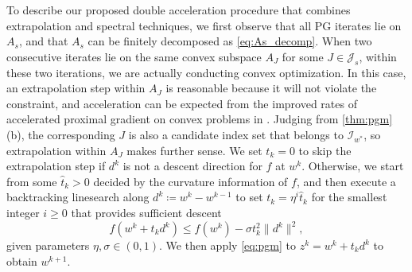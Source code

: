 \documentclass{article}
\theoremstyle{plain}
\theoremstyle{definition}
\theoremstyle{remark}
\newcommand{\I}{\mathcal{I}}
\newcommand{\J}{\mathcal{J}}
\begin{document}
To describe our proposed double acceleration procedure that combines
extrapolation and spectral techniques, we first observe that all PG iterates 
lie on $A_s$, 
and that $A_s$ can be finitely decomposed as \cref{eq:As_decomp}. When two 
consecutive iterates lie 
on the same convex subspace $A_J$ for some $J\in \J_s$, within these two iterations, we
are actually conducting convex optimization.
In this case, an extrapolation step within $A_J$ is reasonable because it will 
not
violate the constraint, and acceleration can be expected from the
improved rates of accelerated proximal gradient on convex problems in
\cite{BeckTeboulle09,Nes13a}.
Judging from \cref{thm:pgm} (b),
the corresponding $J$ is also a candidate index set that belongs to
$\I_{w^*}$, so extrapolation within $A_J$ makes further sense.
We set $t_k = 0$ to skip the extrapolation step if $d^k$ is not a
descent direction for $f$ at $w^k$.
Otherwise, we start from some $\hat t_k > 0$ decided by the curvature
information of $f$, and then execute a backtracking linesearch along
$d^k \coloneqq w^k - w^{k-1}$ to set
$t_k = \eta^i \hat t_k$ for the smallest integer $i\geq 0$ that provides
sufficient descent
\begin{equation}
	f (w^k + t_k d^k) \leq f (w^k) - \sigma t_k^2 \|d^k\|^2,
	\label{eq:suffdecrease}
\end{equation}
given parameters $\eta,\sigma \in (0,1)$.
We then apply \cref{eq:pgm} to $z^k = w^k +
t_k d^k$ to obtain $w^{k+1}$.
\end{document}
